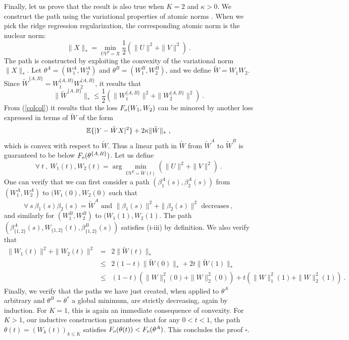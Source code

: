 %


Finally, let us prove that the result is also true when $K=2$ and $\kappa>0$.
We construct the path using the variational properties of atomic norms \cite{bach2013convex}. 
When we pick the ridge regression regularization, the corresponding atomic norm is the 
nuclear norm:
$$\| X \|_{*} = \min_{UV^T = X} \frac{1}{2}( \| U \|^2 + \| V \|^2)~.$$
The path is constructed by exploiting the convexity of the variational norm $\| X\|_{*}$. 
Let $\theta^A = (W_1^A, W_2^A)$ and $\theta^B=(W_1^B, W_2^B)$, and we 
define $\tilde{W} = W_1 W_2$. Since $\tilde{W}^{\{A,B\}} = W_1^{\{A,B\}} W_2^{\{A,B\}} $, 
it results that
\begin{equation}
\label{colcol}
\| \tilde{W}^{\{A,B\}} \|_* \leq \frac{1}{2} ( \| W_1^{\{A,B\}}\|^2 + \| W_2^{\{A,B\}}\|^2)~.
\end{equation}
From (\ref{colcol}) it results that the loss $F_{o}(W_1, W_2)$ can be minored by another loss 
 expressed in terms of $\tilde{W}$ of the form 
$${\mathbb{E}} \{ | Y - \tilde{W} X |^2 \} + 2\kappa \| \tilde{W} \|_*~,$$ 
which is convex with respect to $\tilde{W}$. Thus a linear path in $\tilde{W}$ from 
$\tilde{W}^A$ to $\tilde{W}^B$ is guaranteed to be below $F_{o}(\theta^{\{A,B\}})$. 
Let us define 
$$\forall~t~,~W_{1}(t), W_{2}(t) = \arg\min_{UV^T= \tilde{W}(t)} (\| U\|^2 + \|V \|^2)~. $$ 
One can verify that we can first consider a path $(\beta^A_1(s), \beta^A_2(s))$ 
from $(W_1^{A}, W_2^{A})$ to $(W_{1}(0), W_{2}(0)$ such that 
$$\forall~s~\beta_1(s) \beta_2(s) = \tilde{W}^A \text{ and } \| \beta_1(s) \|^2 + \| \beta_2(s) \|^2 \text{ decreases} ~,$$
and similarly for $(W_1^{B}, W_2^{B})$ to $(W_{1}(1), W_{2}(1)$.
The path $(\beta_{\{1,2\}}^A(s), W_{\{1,2\}}(t), \beta_{\{1,2\}}^B(s))$ satisfies (i-iii) by definition. We also verify that 
\begin{eqnarray*}
\| W_{1}(t) \|^2 + \| W_{2}(t) \|^2 &=& 2 \| \tilde{W}(t)\|_{*}   \\
&\leq & 2 (1-t) \|  \tilde{W}(0)\|_{*} + 2 t  \|  \tilde{W}(1)\|_{*} \\ 
&\leq & (1-t) ( \| W \|_{1}^2(0) + \| W \|_{2}^2(0)  ) + t (\| W \|_{1}^2(1) + \| W \|_{2}^2(1))~.
\end{eqnarray*}
Finally, we verify that the paths we have just created, when applied to $\theta^A$ arbitrary and 
$\theta^B = \theta^*$ a global minimum, are strictly decreasing, again by induction. 
For $K=1$, this is again an immediate consequence of convexity. 
For $K>1$, our inductive construction guarantees that for any $0<t<1$, 
the path $\theta(t) = (W_k(t))_{k \leq K}$ satisfies $F_{o}(\theta(t)) < F_{o}(\theta^A)$. 
 This concludes the proof $\square$. 


